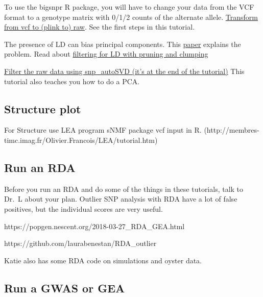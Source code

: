 \documentclass[
  letterpaper,
  DIV=11,
  numbers=noendperiod]{scrreprt}
\begin{document}
To use the bigsnpr R package, you will have to change your data from the
VCF format to a genotype matrix with 0/1/2 counts of the alternate
allele. \href{https://github.com/laurabenestan/RDA_outlier}{Transform
from vcf to (plink to) raw}. See the first steps in this tutorial.

The presence of LD can bias principal components. This
\href{https://academic.oup.com/bioinformatics/article/36/16/4449/5838185?login=true}{paper}
explains the problem. Read about
\href{https://privefl.github.io/bigsnpr/articles/pruning-vs-clumping.html}{filtering
for LD with pruning and clumping}

\href{https://privefl.github.io/bigsnpr/articles/how-to-PCA.html}{Filter
the raw data using snp\_autoSVD (it's at the end of the tutorial)} This
tutorial also teaches you how to do a PCA.

\hypertarget{structure-plot}{%
\subsection*{\texorpdfstring{\textbf{Structure
plot}}{Structure plot}}\label{structure-plot}}

For Structure use LEA program sNMF package vcf input in R.
(http://membres-timc.imag.fr/Olivier.Francois/LEA/tutorial.htm)

\hypertarget{run-an-rda}{%
\subsection*{\texorpdfstring{\textbf{Run an
RDA}}{Run an RDA}}\label{run-an-rda}}

Before you run an RDA and do some of the things in these tutorials, talk
to Dr.~L about your plan. Outlier SNP analysis with RDA have a lot of
false positives, but the individual scores are very useful.

https://popgen.nescent.org/2018-03-27\_RDA\_GEA.html

https://github.com/laurabenestan/RDA\_outlier

Katie also has some RDA code on simulations and oyster data.

\hypertarget{run-a-gwas-or-gea}{%
\subsection*{\texorpdfstring{\textbf{Run a GWAS or
GEA}}{Run a GWAS or GEA}}\label{run-a-gwas-or-gea}}
\end{document}
